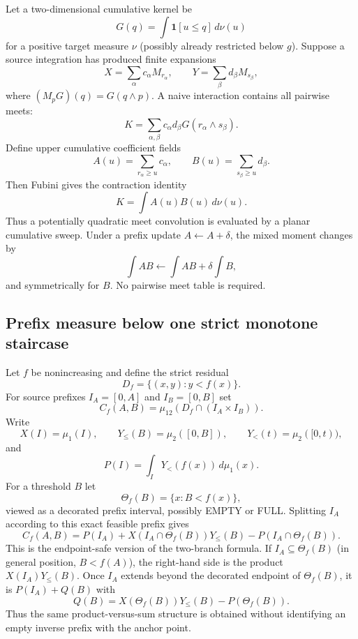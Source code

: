 \documentclass[12pt,a4paper]{article}
\theoremstyle{definition}
\newcommand{\1}{\mathbf 1}
\newcommand{\meet}{\wedge}
\begin{document}
Let a two-dimensional cumulative kernel be
\[
G(q)=\int \1[u\le q] \,d\nu(u)
\]
for a positive target measure $\nu$ (possibly already restricted below $g$). Suppose a source integration has produced finite expansions
\[
X=\sum_\alpha c_\alpha M_{r_\alpha},\qquad
Y=\sum_\beta d_\beta M_{s_\beta},
\]
where $(M_pG)(q)=G(q\meet p)$. A naive interaction contains all pairwise meets:
\[
K=\sum_{\alpha,\beta}c_\alpha d_\beta G(r_\alpha\meet s_\beta).
\]
Define upper cumulative coefficient fields
\[
A(u)=\sum_{r_\alpha\ge u}c_\alpha,
\qquad
B(u)=\sum_{s_\beta\ge u}d_\beta.
\]
Then Fubini gives the contraction identity
\begin{equation}
\boxed{K=\int A(u)B(u)\,d\nu(u).}                              \label{eq:meetcontract}
\end{equation}
Thus a potentially quadratic meet convolution is evaluated by a planar cumulative sweep. Under a prefix update $A\leftarrow A+\delta$, the mixed moment changes by
\[
\int AB\leftarrow\int AB+\delta\int B,
\]
and symmetrically for $B$. No pairwise meet table is required.

\subsection{Prefix measure below one strict monotone staircase}

Let $f$ be nonincreasing and define the strict residual
\[
D_f=\{(x,y):y<f(x)\}.
\]
For source prefixes $I_A=[0,A]$ and $I_B=[0,B]$ set
\[
C_f(A,B)=\mu_{12}(D_f\cap(I_A\times I_B)).
\]
Write
\[
X(I)=\mu_1(I),\qquad Y_{\le}(B)=\mu_2([0,B]),\qquad
Y_{<}(t)=\mu_2([0,t)),
\]
and
\[
P(I)=\int_IY_{<}(f(x))\,d\mu_1(x).
\]
For a threshold $B$ let
\[
\Theta_f(B)=\{x:B<f(x)\},
\]
viewed as a decorated prefix interval, possibly EMPTY or FULL.  Splitting $I_A$ according to this exact feasible prefix gives
\begin{equation}
\boxed{
C_f(A,B)=P(I_A)+X(I_A\cap\Theta_f(B))Y_{\le}(B)
-P(I_A\cap\Theta_f(B)).}                                   \label{eq:twobranch}
\end{equation}
This is the endpoint-safe version of the two-branch formula.  If $I_A\subseteq\Theta_f(B)$ (in general position, $B<f(A)$), the right-hand side is the product $X(I_A)Y_{\le}(B)$.  Once $I_A$ extends beyond the decorated endpoint of $\Theta_f(B)$, it is $P(I_A)+Q(B)$ with
\[
Q(B)=X(\Theta_f(B))Y_{\le}(B)-P(\Theta_f(B)).
\]
Thus the same product-versus-sum structure is obtained without identifying an empty inverse prefix with the anchor point.
\end{document}
